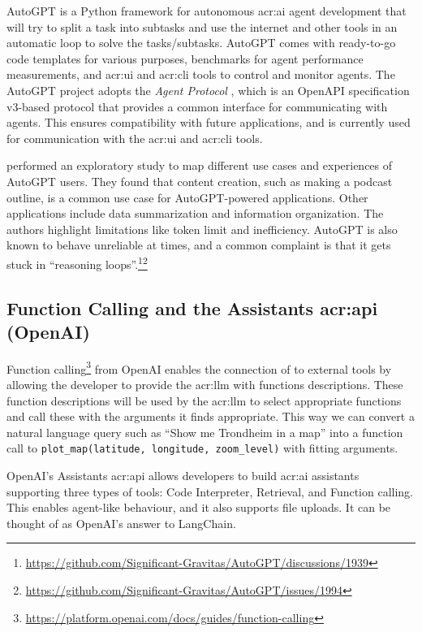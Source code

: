 AutoGPT \citep{richardAutoGPTHeartOpensource2023} is a Python framework for autonomous \acrshort{acr:ai} agent development that will try to split a task into subtasks and use the internet and other tools in an automatic loop to solve the tasks/subtasks. AutoGPT comes with ready-to-go code templates for various purposes, benchmarks for agent performance measurements, and \acrshort{acr:ui} and \acrshort{acr:cli} tools to control and monitor agents. The AutoGPT project adopts the \textit{Agent Protocol} \citep{AgentProtocol}, which is an OpenAPI specification v3-based protocol that provides a common interface for communicating with agents. This ensures compatibility with future applications, and is currently used for communication with the \acrshort{acr:ui} and \acrshort{acr:cli} tools.

\cite{firatWhatIfGPT42023} performed an exploratory study to map different use cases and experiences of AutoGPT users. They found that content creation, such as making a podcast outline, is a common use case for AutoGPT-powered applications. Other applications include data summarization and information organization. The authors highlight limitations like token limit and inefficiency. AutoGPT is also known to behave unreliable at times, and a common complaint is that it gets stuck in \enquote{reasoning loops}.\footnote{\url{https://github.com/Significant-Gravitas/AutoGPT/discussions/1939}}\footnote{\url{https://github.com/Significant-Gravitas/AutoGPT/issues/1994}}

\subsection[Function Calling and the Assistants API (OpenAI)]{Function Calling and the Assistants \acrshort{acr:api} (OpenAI)}

Function calling\footnote{\url{https://platform.openai.com/docs/guides/function-calling}} from OpenAI enables the connection of  to external tools by allowing the developer to provide the \acrshort{acr:llm} with functions descriptions. These function descriptions will be used by the \acrshort{acr:llm} to select appropriate functions and call these with the arguments it finds appropriate. This way we can convert a natural language query such as \enquote{Show me Trondheim in a map} into a function call to \texttt{plot\_map(latitude, longitude, zoom\_level)} with fitting arguments.

OpenAI's Assistants \acrshort{acr:api} allows developers to build \acrshort{acr:ai} assistants supporting three types of tools: Code Interpreter, Retrieval, and Function calling. This enables agent-like behaviour, and it also supports file uploads. It can be thought of as OpenAI's answer to LangChain.

